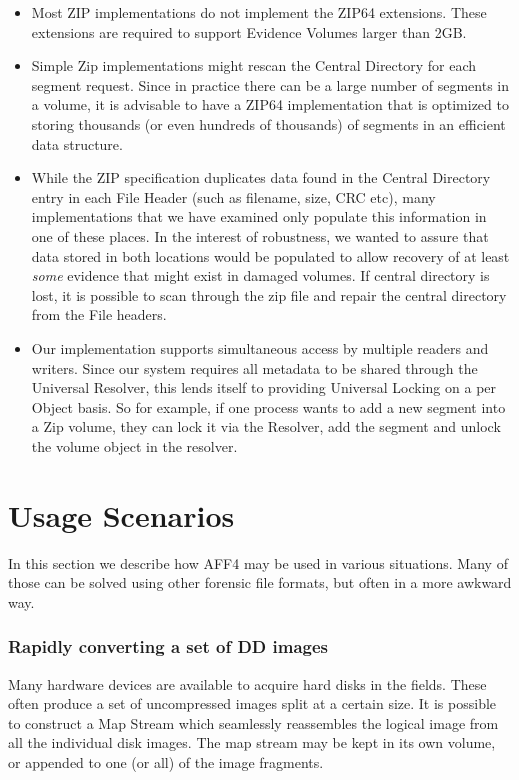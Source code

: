 \documentclass[10pt, conference]{IEEEtran}
\begin{document}
\begin{itemize}
\item Most ZIP implementations do not implement the ZIP64
  extensions. These extensions are required to support Evidence
  Volumes larger than 2GB.
\item Simple Zip implementations might rescan the
Central Directory for each segment request. Since in practice there
can be a large number of segments in a volume, it is advisable to have
a ZIP64 implementation that is optimized to storing thousands (or even
hundreds of thousands) of segments in an efficient data structure. 
\item While the ZIP specification duplicates data found in the Central
  Directory entry in each File Header (such as filename, size, CRC
  etc), many implementations that we have examined only populate this
  information in one of these places. In the interest of robustness,
  we wanted to assure that data stored in both locations would be
  populated to allow recovery of at least \emph{some} evidence that
  might exist in damaged volumes. If central directory is lost, it is
  possible to scan through the zip file and repair the central
  directory from the File headers.

\item Our implementation supports simultaneous access by multiple
  readers and writers. Since our system requires all metadata to be
  shared through the Universal Resolver, this lends itself to
  providing Universal Locking on a per Object basis. So for example,
  if one process wants to add a new segment into a Zip volume, they
  can lock it via the Resolver, add the segment and unlock the volume
  object in the resolver.
\end{itemize}

\section{Usage Scenarios}
In this section we describe how AFF4 may be used in various
situations. Many of those can be solved using other forensic file
formats, but often in a more awkward way.

\subsubsection{Rapidly converting a set of DD images}
Many hardware devices are available to acquire hard disks in the
fields. These often produce a set of uncompressed images split at a
certain size. It is possible to construct a Map Stream which
seamlessly reassembles the logical image from all the individual disk
images. The map stream may be kept in its own volume, or appended to
one (or all) of the image fragments.
\end{document}
